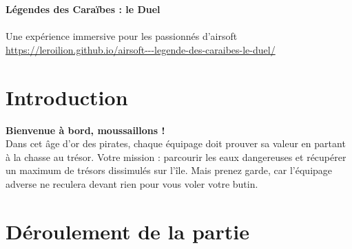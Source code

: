 \documentclass{pirategame}
\begin{document}
\begin{titlepage}
    \centering
    \vspace*{0.5in}
    {\Huge \textbf{Légendes des Caraïbes : le Duel}}\\

    \vspace{0.5in}
    \\[1cm]
    \vspace{0.5in}
    {\Large Une expérience immersive pour les passionnés d'airsoft}
    {\large \url{https://leroilion.github.io/airsoft---legende-des-caraibes-le-duel/}}
\end{titlepage}

\section{Introduction}
\textbf{Bienvenue à bord, moussaillons !} \\
Dans cet âge d'or des pirates, chaque équipage doit prouver sa valeur en partant à la chasse au trésor. Votre mission : parcourir les eaux dangereuses et récupérer un maximum de trésors dissimulés sur l'île. Mais prenez garde, car l'équipage adverse ne reculera devant rien pour vous voler votre butin.

\section{Déroulement de la partie}
\end{document}
